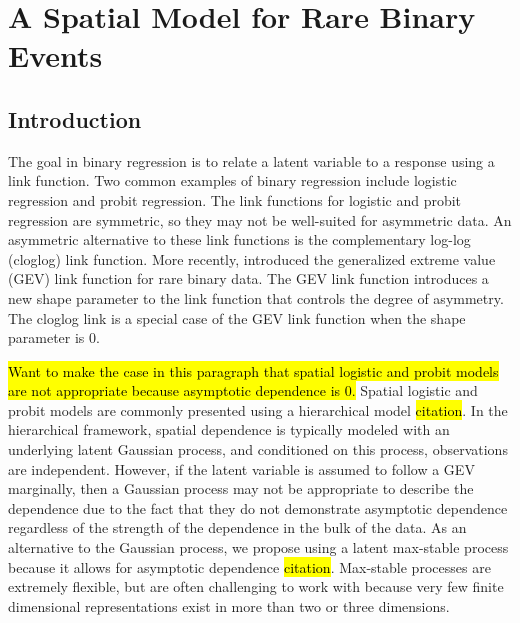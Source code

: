 \chapter{A Spatial Model for Rare Binary Events}
\label{chap:three}
\section{Introduction}\label{s:intro}

The goal in binary regression is to relate a latent variable to a response using a link function.
Two common examples of binary regression include logistic regression
and probit regression.
The link functions for logistic and probit regression are symmetric, so they may not be well-suited for asymmetric data.
An asymmetric alternative to these link functions is the complementary log-log (cloglog) link function.
More recently, \citet{Wang2010} introduced the generalized extreme value (GEV) link function for rare binary data.
The GEV link function introduces a new shape parameter to the link function that controls the degree of asymmetry.
The cloglog link is a special case of the GEV link function when the shape parameter is 0.

\hl{Want to make the case in this paragraph that spatial logistic and probit models are not appropriate because asymptotic dependence is 0.}
Spatial logistic and probit models are commonly presented using a hierarchical model \hl{citation}.
In the hierarchical framework, spatial dependence is typically modeled with an underlying latent Gaussian process, and conditioned on this process, observations are independent.
However, if the latent variable is assumed to follow a GEV marginally, then a Gaussian process may not be appropriate to describe the dependence due to the fact that they do not demonstrate asymptotic dependence regardless of the strength of the dependence in the bulk of the data.
As an alternative to the Gaussian process, we propose using a latent max-stable process because it allows for asymptotic dependence \hl{citation}.
Max-stable processes are extremely flexible, but are often challenging to work with because very few finite dimensional representations exist in more than two or three dimensions.


